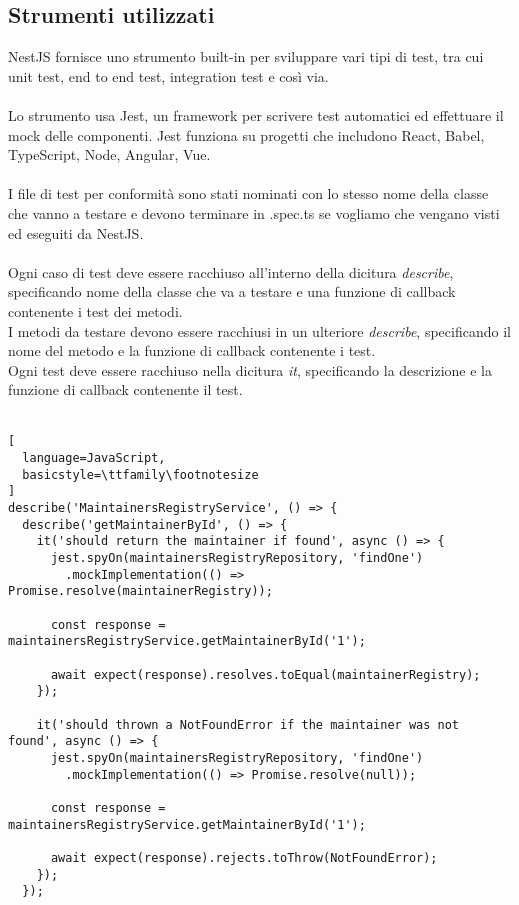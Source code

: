 \subsection{Strumenti utilizzati}
NestJS fornisce uno strumento built-in per sviluppare vari tipi di test, tra cui unit test, 
end to end test, integration test e così via. 
\\\\
Lo strumento usa Jest, un framework per scrivere test automatici ed effettuare 
il \gls{mock} delle componenti. Jest funziona su progetti che includono  React, Babel, TypeScript, Node,
Angular, Vue.
\\\\
I file di test per conformità sono stati nominati con lo stesso nome della classe che vanno
a testare e devono terminare in .spec.ts se vogliamo che vengano visti ed eseguiti da NestJS.
\\\\
Ogni caso di test deve essere racchiuso all'interno della dicitura \textit{describe}, specificando nome della
classe che va a testare e una funzione di callback contenente i test dei metodi.
\\
I metodi da testare devono essere racchiusi in un ulteriore \textit{describe}, specificando il nome
del metodo e la funzione di callback contenente i test.
\\
Ogni test deve essere racchiuso nella dicitura \textit{it}, specificando la descrizione e la funzione 
di callback contenente il test.
\\\\
\begin{lstlisting}[
  language=JavaScript,
  basicstyle=\ttfamily\footnotesize
]
describe('MaintainersRegistryService', () => {
  describe('getMaintainerById', () => {
    it('should return the maintainer if found', async () => {
      jest.spyOn(maintainersRegistryRepository, 'findOne')
        .mockImplementation(() => Promise.resolve(maintainerRegistry));

      const response = maintainersRegistryService.getMaintainerById('1');

      await expect(response).resolves.toEqual(maintainerRegistry);
    });

    it('should thrown a NotFoundError if the maintainer was not found', async () => {
      jest.spyOn(maintainersRegistryRepository, 'findOne')
        .mockImplementation(() => Promise.resolve(null));

      const response = maintainersRegistryService.getMaintainerById('1');

      await expect(response).rejects.toThrow(NotFoundError);
    });
  });
\end{lstlisting}

